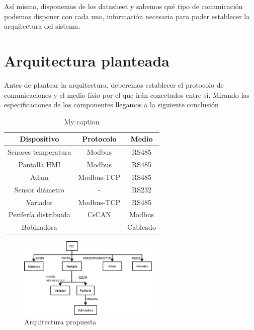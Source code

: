 Así mismo, disponemos de los datasheet y sabemos qué tipo de comunicación podemos disponer con cada uno, información necesaria para poder establecer la arquitectura del sistema.

\section{Arquitectura planteada}
\label{arquitectura}

Antes de plantear la arquitectura, deberemos establecer el protocolo de comunicaciones y el medio físio por el que irán conectados entre sí. Mirando las especificaciones de los componentes llegamos a la siguiente conclusión

\begin{table}[]

\begin{tabular}{ccc}
\hline
{\bf Dispositivo}     & {\bf Protocolo} & {\bf Medio} \\ \hline
Senores temperatura   & Modbus          & RS485       \\
Pantalla HMI          & Modbus          & RS485       \\
Adam                  & Modbus-TCP      & RS485       \\
Sensor diámetro       & -               & RS232       \\
Variador              & Modbus-TCP      & RS485       \\
Perifería distribuida & CsCAN           & Modbus      \\
Bobinadora            &                 & Cableado    \\ \hline
\end{tabular}
\centering
\caption{My caption}
\label{my-label}
\end{table}


 	\begin{figure}[H]
            \centering
            \includegraphics[width=0.6\textwidth]{images/20141229.png}
            \caption{Arquitectura propuesta}
            \label{fig:hardware_arquitectura}
    \end{figure}
